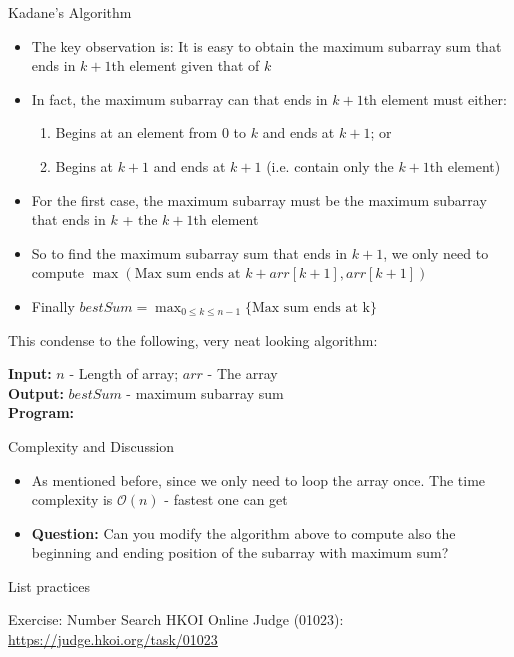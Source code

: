 \documentclass[10pt,xcolor={table,dvipsnames},t]{beamer}
\begin{document}
\begin{frame}{Kadane's Algorithm}
  \begin{itemize}
    \item The key observation is: It is easy to obtain the maximum subarray sum that ends in $k+1$th element given that of $k$
    \item In fact, the maximum subarray can that ends in $k+1$th element must either:
    \begin{enumerate}
      \item Begins at an element from $0$ to $k$ and ends at $k+1$; or
      \item Begins at $k+1$ and ends at $k+1$ (i.e. contain only the $k+1$th element)
    \end{enumerate}
    \item For the first case, the maximum subarray must be the maximum subarray that ends in $k$ + the $k+1$th element
    \item So to find the maximum subarray sum that ends in $k+1$, we only need to compute $\max(\text{Max sum ends at }k + arr[k+1],arr[k+1])$
    \item Finally $bestSum = \max_{0 \leq k \leq n-1} \{\text{Max sum ends at k}\}$
  \end{itemize}
\end{frame}

\begin{frame}
  This condense to the following, very neat looking algorithm:
  \begin{algorithm}[H]
    \caption{Maximum subarray sum (Kadane's Algorithm)} \label{alg:max_subarr_kadane}
    \begin{flushleft}
      \textbf{Input:} $n$ - Length of array; $arr$ - The array \\
      \textbf{Output:} $bestSum$ - maximum subarray sum\\
      \textbf{Program:} 
    \end{flushleft}
    
    \begin{algorithmic}
      \EndFor
    \end{algorithmic}
  \end{algorithm}
\end{frame}

\begin{frame}{Complexity and Discussion}
  \begin{itemize}
    \item As mentioned before, since we only need to loop the array once. The time complexity is $\mathcal{O}(n)$ - fastest one can get
    \item \textbf{Question:} Can you modify the algorithm above to compute also the beginning and ending position of the subarray with maximum sum?
  \end{itemize} 
\end{frame}

\begin{frame}{List practices}
  \begin{exampleblock}{Exercise: Number Search}
    HKOI Online Judge (01023): \href{https://judge.hkoi.org/task/01023}{https://judge.hkoi.org/task/01023}
  \end{exampleblock}
\end{frame}
\end{document}
